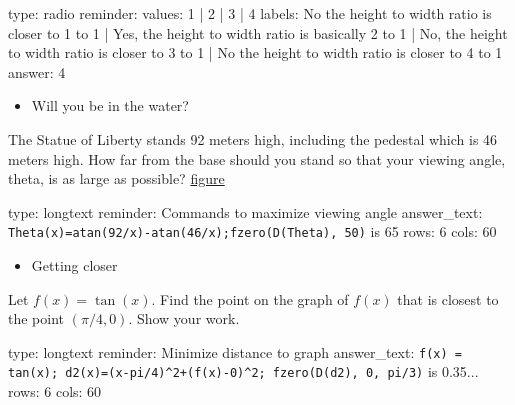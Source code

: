 \documentclass[12pt]{article}
\begin{document}
\begin{answer}
type: radio
reminder: 
values: 1 | 2 | 3 | 4
labels: No the height to width ratio is closer to 1 to 1 | Yes, the height to width ratio is basically 2 to 1 | No, the height to width ratio is closer to 3 to 1 | No the height to width ratio is closer to 4 to 1
answer: 4
\end{answer}

\begin{itemize}
\itemsep1pt\parskip0pt
\item
  Will you be in the water?
\end{itemize}

The Statue of Liberty stands 92 meters high, including the pedestal
which is 46 meters high. How far from the base should you stand so that
your viewing angle, theta, is as large as possible?
\href{http://astro.temple.edu/~dhill001/maxmin/viewanglepic.gif}{figure}

\begin{answer}
type: longtext
reminder: Commands to maximize viewing angle
answer_text: \verb#Theta(x)=atan(92/x)-atan(46/x);fzero(D(Theta), 50)# is 65 
rows: 6
cols: 60
\end{answer}

\begin{itemize}
\itemsep1pt\parskip0pt
\item
  Getting closer
\end{itemize}

Let $f(x) = \tan(x)$. Find the point on the graph of $f(x)$ that is
closest to the point $(\pi/4, 0)$. Show your work.

\begin{answer}
type: longtext
reminder: Minimize distance to graph
answer_text: \verb#f(x) = tan(x); d2(x)=(x-pi/4)^2+(f(x)-0)^2; fzero(D(d2), 0, pi/3)# is 0.35... 
rows: 6
cols: 60
\end{answer}
\end{document}
